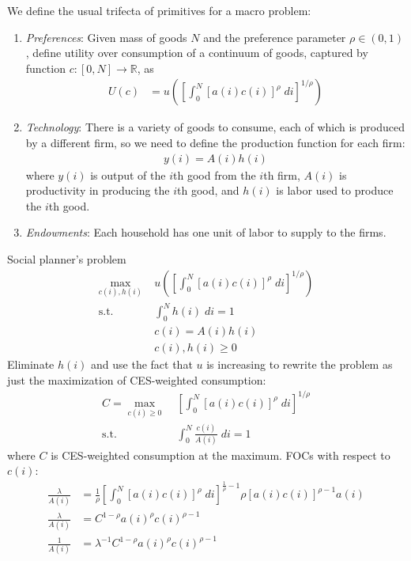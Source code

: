 \documentclass[12pt]{article}
\theoremstyle{plain}
\theoremstyle{definition}
\theoremstyle{remark}
\newcommand{\ra}{\rightarrow}
\newcommand{\R}{\mathbb{R}}
\newcommand{\intzN}{\int_0^N}
\begin{document}
We define the usual trifecta of primitives for a macro problem:
\begin{enumerate}
  \item \emph{Preferences}:
    Given mass of goods $N$ and the preference parameter $\rho\in(0,1)$,
    define utility over consumption of a continuum of goods, captured by
    function $c:[0,N]\ra \R$, as
    \begin{align*}
      U(c) &=
      u\left(
      \left[
      \int_0^N [a(i)c(i)]^\rho \; di
      \right]^{1/\rho}
      \right)
    \end{align*}

  \item \emph{Technology}:
    There is a variety of goods to consume, each of which is produced by
    a different firm, so we need to define the production function for
    each firm:
    \begin{align*}
      y(i) = A(i) h(i)
    \end{align*}
    where $y(i)$ is output of the $i$th good from the $i$th firm, $A(i)$
    is productivity in producing the $i$th good, and $h(i)$ is labor
    used to produce the $i$th good.

  \item \emph{Endowments}: Each household has one unit of labor to
    supply to the firms.
\end{enumerate}
Social planner's problem
\begin{align*}
  \max_{c(i),h(i)}
  &\;
  u\left( \left[ \int_0^N [a(i)c(i)]^\rho \; di \right]^{1/\rho} \right)
  \\
  \text{s.t.}
  &\; \intzN h(i) \; di = 1 \\
  &\; c(i) = A(i) h(i) \\
  &\; c(i),h(i)\geq 0
\end{align*}
Eliminate $h(i)$ and use the fact that $u$ is increasing to rewrite the
problem as just the maximization of CES-weighted consumption:
\begin{align*}
  C=
  \max_{c(i)\geq 0}
  &\;
  \left[ \int_0^N [a(i)c(i)]^\rho \; di \right]^{1/\rho}
  \\
  \text{s.t.}
  &\; \intzN \frac{c(i)}{A(i)} \; di = 1
\end{align*}
where $C$ is CES-weighted consumption at the maximum.
FOCs with respect to $c(i)$:
\begin{align*}
  \frac{\lambda}{A(i)}
  &=
  \frac{1}{\rho}\left[
    \int_0^N [a(i)c(i)]^\rho \; di
  \right]^{\frac{1}{\rho}-1}
  \rho [a(i) c(i)]^{\rho-1} a(i)
  \\
  \frac{\lambda}{A(i)}
  &=
  C^{1-\rho}
  a(i)^\rho c(i)^{\rho-1}
  \\
  \frac{1}{A(i)}
  &=
  \lambda^{-1}
  C^{1-\rho}
  a(i)^\rho c(i)^{\rho-1}
\end{align*}
\end{document}
